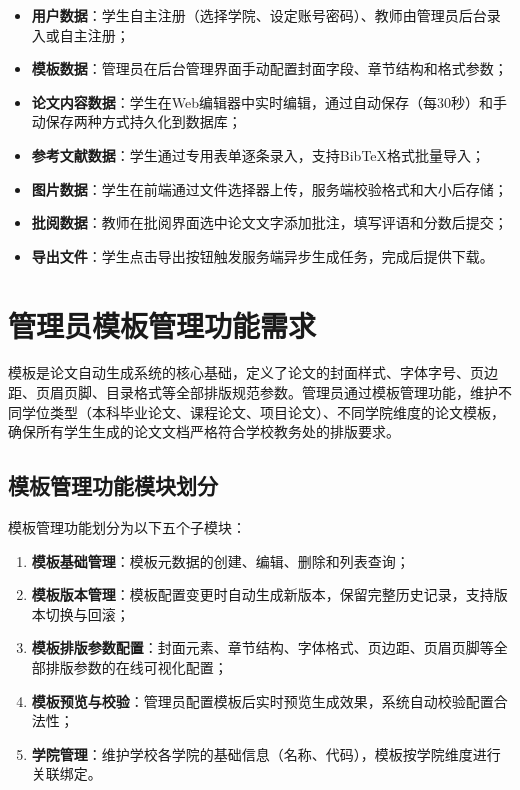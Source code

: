 \documentclass{../../softeng}
\begin{document}
\begin{itemize}
    \item \textbf{用户数据}：学生自主注册（选择学院、设定账号密码）、教师由管理员后台录入或自主注册；
    \item \textbf{模板数据}：管理员在后台管理界面手动配置封面字段、章节结构和格式参数；
    \item \textbf{论文内容数据}：学生在Web编辑器中实时编辑，通过自动保存（每30秒）和手动保存两种方式持久化到数据库；
    \item \textbf{参考文献数据}：学生通过专用表单逐条录入，支持BibTeX格式批量导入；
    \item \textbf{图片数据}：学生在前端通过文件选择器上传，服务端校验格式和大小后存储；
    \item \textbf{批阅数据}：教师在批阅界面选中论文文字添加批注，填写评语和分数后提交；
    \item \textbf{导出文件}：学生点击导出按钮触发服务端异步生成任务，完成后提供下载。
\end{itemize}

\section{管理员模板管理功能需求}

模板是论文自动生成系统的核心基础，定义了论文的封面样式、字体字号、页边距、页眉页脚、目录格式等全部排版规范参数。管理员通过模板管理功能，维护不同学位类型（本科毕业论文、课程论文、项目论文）、不同学院维度的论文模板，确保所有学生生成的论文文档严格符合学校教务处的排版要求。

\subsection{模板管理功能模块划分}

模板管理功能划分为以下五个子模块：

\begin{enumerate}
    \item \textbf{模板基础管理}：模板元数据的创建、编辑、删除和列表查询；
    \item \textbf{模板版本管理}：模板配置变更时自动生成新版本，保留完整历史记录，支持版本切换与回滚；
    \item \textbf{模板排版参数配置}：封面元素、章节结构、字体格式、页边距、页眉页脚等全部排版参数的在线可视化配置；
    \item \textbf{模板预览与校验}：管理员配置模板后实时预览生成效果，系统自动校验配置合法性；
    \item \textbf{学院管理}：维护学校各学院的基础信息（名称、代码），模板按学院维度进行关联绑定。
\end{enumerate}
\end{document}
